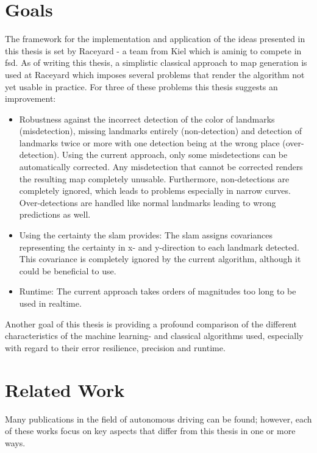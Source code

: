 


\section{Goals}
The framework for the implementation and application of the ideas presented in this thesis is set by Raceyard - a team from Kiel which is aminig to compete in \ac{fsd}. As of writing this thesis, a simplistic classical approach to map generation is used at Raceyard which imposes several problems that render the algorithm not yet usable in practice. For three of these problems this thesis suggests an improvement:

\begin{itemize}
    \item Robustness against the incorrect detection of the color of landmarks (misdetection), missing landmarks entirely (non-detection) and detection of landmarks twice or more with one detection being at the wrong place (over-detection). Using the current approach, only some misdetections can be automatically corrected. Any misdetection that cannot be corrected renders the resulting map completely unusable. Furthermore, non-detections are completely ignored, which leads to problems especially in narrow curves. Over-detections are handled like normal landmarks leading to wrong predictions as well.
    \item Using the certainty the \ac{slam} provides: The \ac{slam} assigns covariances representing the certainty in x- and y-direction to each landmark detected. This covariance is completely ignored by the current algorithm, although it could be beneficial to use.
    \item Runtime: The current approach takes orders of magnitudes too long to be used in realtime.
\end{itemize}
Another goal of this thesis is providing a profound comparison of the different characteristics of the machine learning- and classical algorithms used, especially with regard to their error resilience, precision and runtime.

\section{Related Work}
Many publications in the field of autonomous driving can be found; however, each of these works focus on key aspects that differ from this thesis in one or more ways. 

